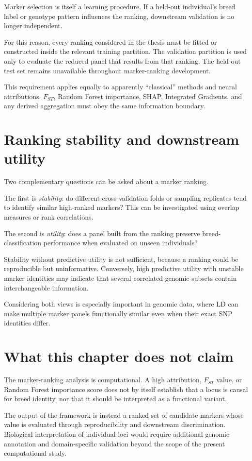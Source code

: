Marker selection is itself a learning procedure. If a held-out
individual's breed label or genotype pattern influences the ranking,
downstream validation is no longer independent.

For this reason, every ranking considered in the thesis must be fitted
or constructed inside the relevant training partition. The validation
partition is used only to evaluate the reduced panel that results from
that ranking. The held-out test set remains unavailable throughout
marker-ranking development.

This requirement applies equally to apparently ``classical'' methods
and neural attributions. $F_{ST}$, Random Forest importance, SHAP,
Integrated Gradients, and any derived aggregation must obey the same
information boundary.

\section{Ranking stability and downstream utility}
\label{sec:ranking_stability_utility}

Two complementary questions can be asked about a marker ranking.

The first is \emph{stability}: do different cross-validation folds or
sampling replicates tend to identify similar high-ranked markers? This
can be investigated using overlap measures or rank correlations.

The second is \emph{utility}: does a panel built from the ranking
preserve breed-classification performance when evaluated on unseen
individuals?

Stability without predictive utility is not sufficient, because a
ranking could be reproducible but uninformative. Conversely, high
predictive utility with unstable marker identities may indicate that
several correlated genomic subsets contain interchangeable
information.

Considering both views is especially important in genomic data, where
LD can make multiple marker panels functionally similar even when
their exact SNP identities differ.

\section{What this chapter does not claim}
\label{sec:attribution_not_causality}

The marker-ranking analysis is computational. A high attribution,
$F_{ST}$ value, or Random Forest importance score does not by itself
establish that a locus is causal for breed identity, nor that it
should be interpreted as a functional variant.

The output of the framework is instead a ranked set of candidate
markers whose value is evaluated through reproducibility and
downstream discrimination. Biological interpretation of individual
loci would require additional genomic annotation and domain-specific
validation beyond the scope of the present computational study.
